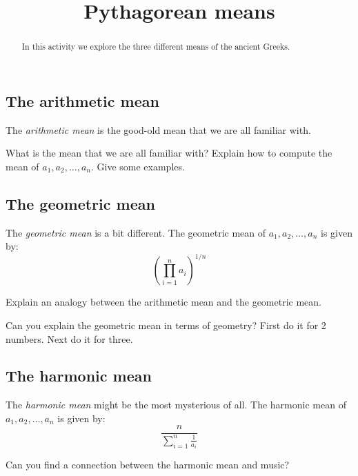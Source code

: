 \documentclass{ximera}
\title{Pythagorean means}
\begin{document}
\begin{abstract}
In this activity we explore the three different means of the
  ancient Greeks.
\end{abstract}
\maketitle


\subsection*{The arithmetic mean}

The \textit{arithmetic mean} is the good-old mean that we are all
familiar with.

\begin{question}
What is the mean that we are all familiar with? Explain how to compute
the mean of $a_1,a_2,\dots,a_n$. Give some examples.
\end{question}

\subsection*{The geometric mean}

The \textit{geometric mean} is a bit different. The geometric mean of $a_1,a_2,\dots, a_n$ is given by:
\[
\left(\prod_{i=1}^n a_i\right)^{1/n}
\]

\begin{question}
Explain an analogy between the arithmetic mean and the geometric mean.
\end{question}

\begin{question}
Can you explain the geometric mean in terms of geometry? First do it
for 2 numbers. Next do it for three.
\end{question}

\subsection*{The harmonic mean}

The \textit{harmonic mean} might be the most mysterious of all. The
harmonic mean of $a_1,a_2,\dots, a_n$ is given by:
\[
\frac{n}{\sum_{i=1}^n \frac{1}{a_i}}
\]

\begin{exploration}
Can you find a connection between the harmonic mean and music?
\end{exploration}
\end{document}

